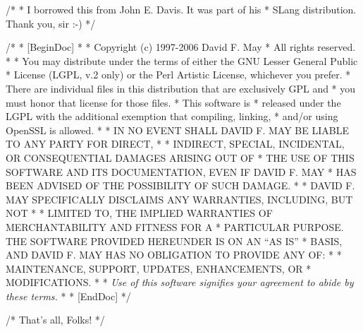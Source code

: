 /*
 * I borrowed this from John E. Davis.  It was part of his
 * SLang distribution.  Thank you, sir :-)
 */

/*
 * [BeginDoc]
 *
 * Copyright (c) 1997-2006 David F. May
 * All rights reserved.
 * 
 * You may distribute under the terms of either the GNU Lesser General Public
 * License (LGPL, v.2 only) or the Perl Artistic License, whichever you prefer.
 * There are individual files in this distribution that are exclusively GPL and
 * you must honor that license for those files.
 * This software is
 * released under the LGPL with the additional exemption that compiling, linking,
 * and/or using OpenSSL is allowed.
 * 
 * IN NO EVENT SHALL DAVID F. MAY BE LIABLE TO ANY PARTY FOR DIRECT,
 * 
 * INDIRECT, SPECIAL, INCIDENTAL, OR CONSEQUENTIAL DAMAGES ARISING OUT OF
 * THE USE OF THIS SOFTWARE AND ITS DOCUMENTATION, EVEN IF DAVID F. MAY
 * HAS BEEN ADVISED OF THE POSSIBILITY OF SUCH DAMAGE.
 * 
 * DAVID F. MAY SPECIFICALLY DISCLAIMS ANY WARRANTIES, INCLUDING, BUT NOT
 * 
 * LIMITED TO, THE IMPLIED WARRANTIES OF MERCHANTABILITY AND FITNESS FOR A
 * PARTICULAR PURPOSE.  THE SOFTWARE PROVIDED HEREUNDER IS ON AN ``AS IS''
 * BASIS, AND DAVID F. MAY HAS NO OBLI\-GA\-TION TO PRO\-VIDE ANY OF:
 * 
 * MAIN\-TE\-NANCE, SUP\-PORT, UP\-DATES, EN\-HANCE\-MENTS, OR
 * MOD\-I\-FI\-CA\-TIONS.
 * 
 * \emph{Use of this software signifies your agreement to abide by these terms.}
 * 
 * [EndDoc]
 */

/* That's all, Folks! */
